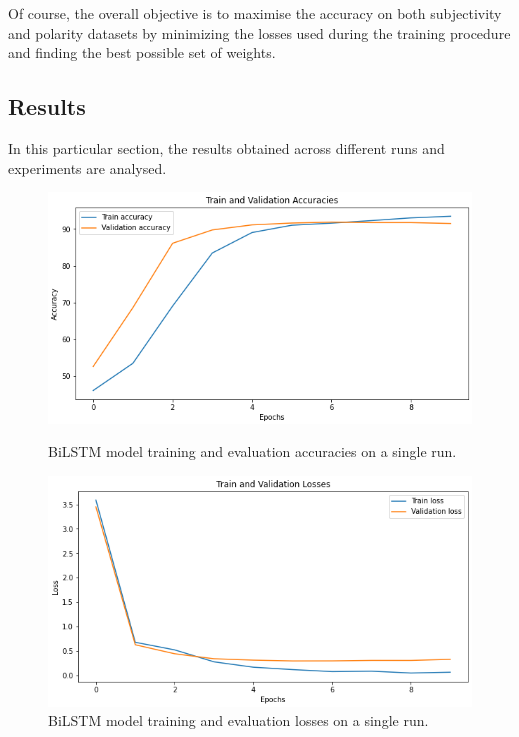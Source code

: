 Of course, the overall objective is to maximise the accuracy on both subjectivity and polarity datasets by minimizing the losses used during the training procedure and 
finding the best possible set of weights. 

\subsection{Results}
\label{subsec:res}
In this particular section, the results obtained across different runs and experiments are analysed. 
\begin{figure}
    \centering
    \includegraphics[scale=0.28]{Images/singlerunacc.png}
    \vspace{-1.0em}
    \caption{BiLSTM model training and evaluation accuracies on a single run.}
    \label{fig:singlerunacc}
    \includegraphics[scale=0.28]{Images/singlerunloss.png}
    \vspace{-1.0em}
    \caption{BiLSTM model training and evaluation losses on a single run.}
    \vspace{-1.0em}
    \label{fig:singlerunloss}
\end{figure}


